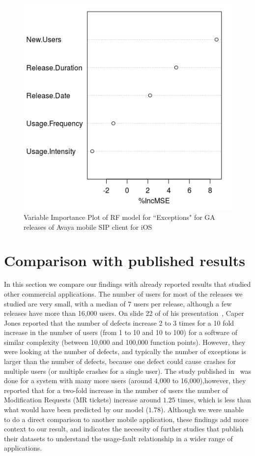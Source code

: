 \documentclass[smallextended]{svjour3}       %
\begin{document}
\begin{figure}[!t]
\centering
\includegraphics[width=0.5\linewidth]{rfI}%
\caption{Variable Importance Plot of RF model for ``Exceptions" for GA releases of Avaya mobile SIP client for iOS}
\label{fig:rfI}
\end{figure}

\section{Comparison with published results}\label{sec:compare}
In this section we compare our findings with already reported results that studied other commercial applications. 
The number of users for most of the releases we studied are very small, with a 
median of 7 users per release, although a few releases have more than 16,000 users.
On slide 22 of of his presentation~\cite{caper}, Caper Jones reported that the
number of defects increase 2 to 3 times for a 10 fold increase in the number of users
(from 1 to 10 and 10 to 100) for a software of similar complexity (between 10,000
and 100,000 function points). However, they were looking at the number of 
defects, and typically the number of 
exceptions is larger than the number of defects, because one defect could cause crashes for multiple users (or multiple crashes for a single user). The study published in~\cite{IQ08} was done for a system with many 
more users (around 4,000 to 16,000),however, they reported that for a two-fold increase in the 
number of users the number of Modification Requests (MR tickets) increase around $1.25$ times, 
which is less than what would have been predicted by our model ($1.78$). Although we
were unable to do a direct comparison to another mobile application, these findings add more context to our result, and indicates the necessity of further studies that publish their datasets to understand the usage-fault relationship in a wider range of applications.
\end{document}
